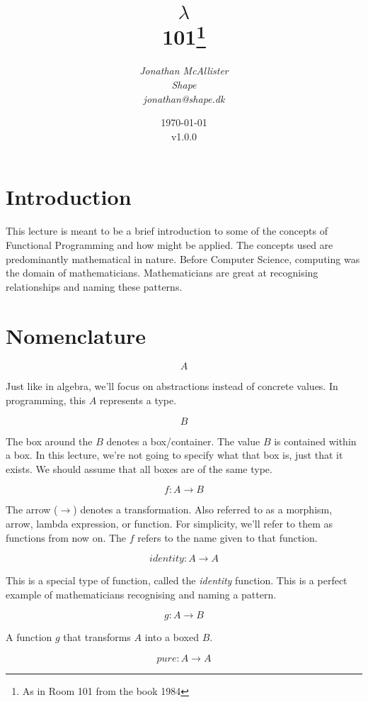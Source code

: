 \documentclass{shpdocumentation}
\title{$\lambda$ \\ 101\footnote{As in Room 101 from the book 1984}}
\author{\itshape Jonathan McAllister \\ Shape \\ \small jonathan@shape.dk}
\date{\today \\ \small v1.0.0}
\begin{document}
\maketitle
\thispagestyle{empty} %
\titlepage

\tableofcontents
\clearpage
\setcounter{page}{1} %

\section{Introduction}

This lecture is meant to be a brief introduction to some of the concepts of Functional Programming and how might be applied.  The concepts used are predominantly mathematical in nature.  Before Computer Science, computing was the domain of mathematicians.  Mathematicians are great at recognising relationships and naming these patterns.

\section{Nomenclature}

\[ A \]

Just like in algebra, we'll focus on abstractions instead of concrete values.  In programming, this $A$ represents a type.

\[ \boxed{B} \]

The box around the $B$ denotes a box/container.  The value $B$ is contained within a box.  In this lecture, we're not going to specify what that box is, just that it exists.  We should assume that all boxes are of the same type.

\[ f\colon A \to B \]

The arrow ($\to$) denotes a transformation. Also referred to as a morphism, arrow, lambda expression, or function.  For simplicity, we'll refer to them as functions from now on.  The $f$ refers to the name given to that function.

\[ identity\colon A \to A \] \label{identity}

This is a special type of function, called the \textit{identity} function.   This is a perfect example of mathematicians recognising and naming a pattern.


\[ g\colon A \to \boxed{B} \]

A function $g$ that transforms $A$ into a boxed $B$.

\[ pure\colon A \to \boxed{A} \]
\end{document}
